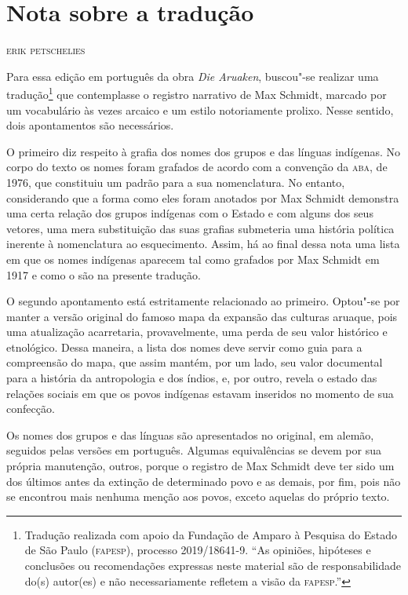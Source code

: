 \chapter*{Nota sobre a tradução}

\begin{flushright}
\textsc{erik petschelies}
\end{flushright}

\noindent{}Para essa edição em português da obra \emph{Die Aruaken}, buscou"-se
realizar uma tradução\footnote{Tradução realizada com apoio da Fundação de Amparo à Pesquisa do Estado de São Paulo (\textsc{fapesp}), processo 2019/18641-9. ``As opiniões, hipóteses e conclusões ou recomendações expressas neste material são de responsabilidade do(s) autor(es) e não necessariamente refletem a visão da \textsc{fapesp}.''} que contemplasse o registro narrativo de Max
Schmidt, marcado por um vocabulário às vezes arcaico e um estilo
notoriamente prolixo. Nesse sentido, dois apontamentos são necessários.

O primeiro diz respeito à grafia dos nomes dos grupos e das línguas
indígenas. No corpo do texto os nomes foram grafados de acordo com a
convenção da \textsc{aba}, de 1976, que constituiu um padrão para a sua
nomenclatura. No entanto, considerando que a forma como eles foram
anotados por Max Schmidt demonstra uma certa relação dos grupos
indígenas com o Estado e com alguns dos seus vetores, uma mera
substituição das suas grafias submeteria uma história política inerente
à nomenclatura ao esquecimento. Assim, há ao final dessa nota uma lista
em que os nomes indígenas aparecem tal como grafados por Max Schmidt em
1917 e como o são na presente tradução.

O segundo apontamento está estritamente relacionado ao primeiro.
Optou"-se por manter a versão original do famoso mapa da expansão das
culturas aruaque, pois uma atualização acarretaria, provavelmente, uma
perda de seu valor histórico e etnológico. Dessa maneira, a lista dos
nomes deve servir como guia para a compreensão do mapa, que assim
mantém, por um lado, seu valor documental para a história da
antropologia e dos índios, e, por outro, revela o estado das relações
sociais em que os povos indígenas estavam inseridos no momento de sua
confecção.

Os nomes dos grupos e das línguas são apresentados no original, em
alemão, seguidos pelas versões em português. Algumas equivalências se
devem por sua própria manutenção, outros, porque o registro de Max
Schmidt deve ter sido um dos últimos antes da extinção de determinado
povo e as demais, por fim, pois não se encontrou mais nenhuma menção aos
povos, exceto aquelas do próprio texto.

